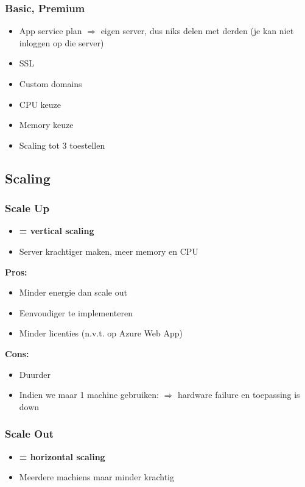 \documentclass{article}
\newcommand{\bold}[1]{\textbf{#1}}
\begin{document}
\subsubsection{Basic, Premium}
\begin{itemize}
    \item App service plan $\Rightarrow$ eigen server, dus niks delen met derden (je kan niet inloggen op die server)
    \item SSL
    \item Custom domains
    \item CPU keuze
    \item Memory keuze
    \item Scaling tot 3 toestellen
\end{itemize}

\subsection{Scaling}

\subsubsection{Scale Up}
\begin{itemize}
    \item \bold{= vertical scaling}
    \item Server krachtiger maken, meer memory en CPU
\end{itemize}

\bold{Pros: }

\begin{itemize}
    \item Minder energie dan scale out
    \item Eenvoudiger te implementeren
    \item Minder licenties (n.v.t. op Azure Web App)
\end{itemize}

\bold{Cons: }

\begin{itemize}
    \item Duurder
    \item Indien we maar 1 machine gebruiken: $\Rightarrow$ hardware failure en toepassing is down
\end{itemize}


\subsubsection{Scale Out}
\begin{itemize}
    \item \bold{= horizontal scaling}
    \item Meerdere machiens maar minder krachtig
\end{itemize}
\end{document}

